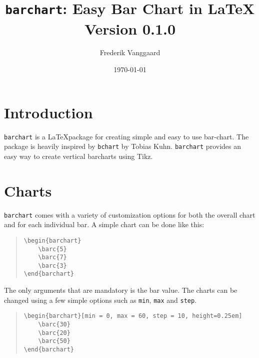 \documentclass[]{article}
\title{\texttt{barchart}: Easy Bar Chart in \LaTeX
	\medskip\\
	\large Version 0.1.0
}
\author{Frederik Vanggaard}
\date{\today}
\begin{document}
\maketitle

\section{Introduction}
\texttt{barchart} is a \LaTeX\space package for creating simple and easy to use bar-chart. The package is heavily inspired by \texttt{bchart} by Tobias Kuhn. \texttt{barchart} provides an easy way to create vertical barcharts using Tikz.  

\section{Charts}
\texttt{barchart} comes with a variety of customization options for both the overall chart and for each individual bar. A simple chart can be done like this:

\begin{quote}\small
\begin{verbatim}
\begin{barchart}
    \barc{5}
    \barc{7}
    \barc{3}
\end{barchart}
\end{verbatim}
\end{quote}
\begin{quote}\small
\begin{figure}[ht]
	\begin{barchart}
	\end{barchart}
\end{figure}
\end{quote}

The only arguments that are mandatory is the bar value. The charts can be changed using a few simple options such as \texttt{min}, \texttt{max} and \texttt{step}.

\begin{quote}\small
\begin{verbatim}
\begin{barchart}[min = 0, max = 60, step = 10, height=0.25em]
    \barc{30}
    \barc{20}
    \barc{50}
\end{barchart}
\end{verbatim}
\end{quote}
\begin{quote}\small
\begin{figure}[ht]
	\begin{barchart}[min = 0, max = 60, step = 10, height=0.25em]
	\end{barchart}
\end{figure}
\end{quote}
\end{document}
